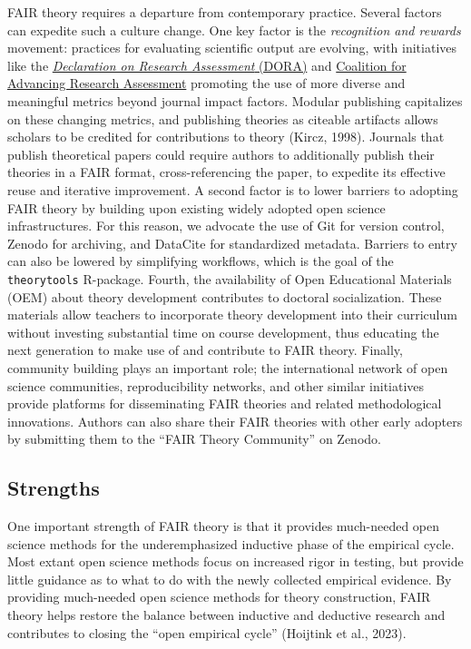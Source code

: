 \documentclass[
  man, noextraspace,floatsintext]{apa6}
\begin{document}
FAIR theory requires a departure from contemporary practice.
Several factors can expedite such a culture change.
One key factor is the \emph{recognition and rewards} movement:
practices for evaluating scientific output are evolving, with initiatives like the \href{https://sfdora.org/read/}{\emph{Declaration on Research Assessment} (DORA)} and \href{https://coara.eu/}{Coalition for Advancing Research Assessment}
promoting the use of more diverse and meaningful metrics beyond journal impact factors.
Modular publishing capitalizes on these changing metrics,
and publishing theories as citeable artifacts allows scholars to be credited for contributions to theory (Kircz, 1998).
Journals that publish theoretical papers could require authors to additionally publish their theories in a FAIR format, cross-referencing the paper,
to expedite its effective reuse and iterative improvement.
A second factor is to lower barriers to adopting FAIR theory by building upon existing widely adopted open science infrastructures.
For this reason, we advocate the use of Git for version control, Zenodo for archiving, and DataCite for standardized metadata.
Barriers to entry can also be lowered by simplifying workflows, which is the goal of the \texttt{theorytools} R-package.
Fourth, the availability of Open Educational Materials (OEM) about theory development contributes to doctoral socialization.
These materials allow teachers to incorporate theory development into their curriculum without investing substantial time on course development,
thus educating the next generation to make use of and contribute to FAIR theory.
Finally, community building plays an important role;
the international network of open science communities, reproducibility networks, and other similar initiatives provide platforms for disseminating FAIR theories and related methodological innovations.
Authors can also share their FAIR theories with other early adopters by submitting them to the ``FAIR Theory Community'' on Zenodo.

\subsection{Strengths}\label{strengths}

One important strength of FAIR theory is that it provides much-needed open science methods for the underemphasized inductive phase of the empirical cycle.
Most extant open science methods focus on increased rigor in testing, but provide little guidance as to what to do with the newly collected empirical evidence.
By providing much-needed open science methods for theory construction,
FAIR theory helps restore the balance between inductive and deductive research and contributes to closing the ``open empirical cycle'' (Hoijtink et al., 2023).
\end{document}
